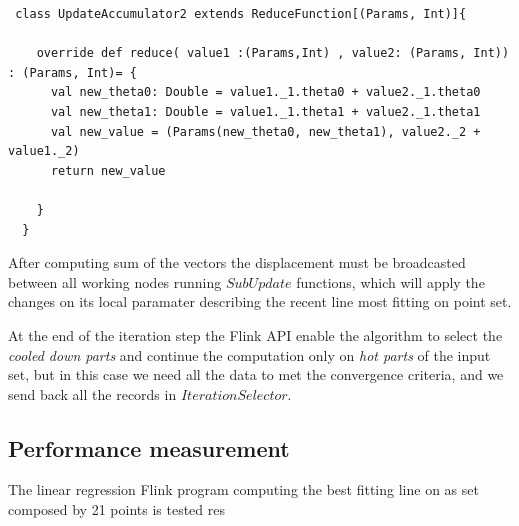 \begin{lstlisting}
 class UpdateAccumulator2 extends ReduceFunction[(Params, Int)]{
   
    override def reduce( value1 :(Params,Int) , value2: (Params, Int)) : (Params, Int)= {
      val new_theta0: Double = value1._1.theta0 + value2._1.theta0
      val new_theta1: Double = value1._1.theta1 + value2._1.theta1
      val new_value = (Params(new_theta0, new_theta1), value2._2 + value1._2)
      return new_value

    }
  }
\end{lstlisting}
After computing sum of the vectors the displacement must be broadcasted between all working nodes running $SubUpdate$ functions, which will apply the changes on its local paramater describing the recent line most fitting on point set.

At the end of the iteration step the Flink API enable the algorithm to select the \textit{cooled down parts} and continue the computation only on \textit{hot parts} of the input set, but in this case we need all the data to met the convergence criteria, and we send back all the records in $IterationSelector$.    

\subsection{Performance measurement}
The linear regression Flink program computing the best fitting line on as set composed by 21 points is tested res
 
      